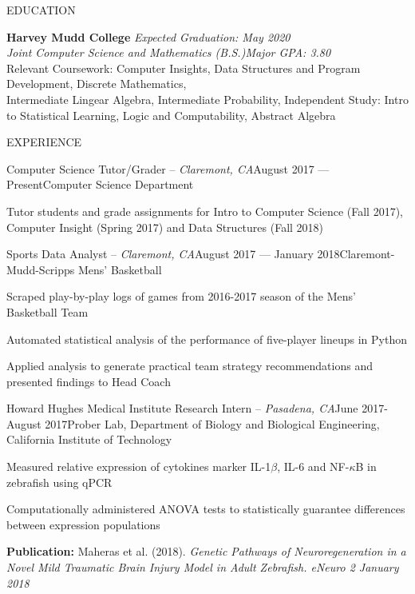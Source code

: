 \documentclass{resume} %
\begin{document}

\begin{rSection}{EDUCATION}

{\bf Harvey Mudd College} \hfill {\em Expected Graduation: May 2020} \\
{\em Joint Computer Science and Mathematics (B.S.)}\hfill {\em Major GPA: 3.80} \\
Relevant Coursework: Computer Insights, Data Structures and Program Development, Discrete Mathematics, \\Intermediate Lingear Algebra, Intermediate Probability, Independent Study: Intro to Statistical Learning, Logic and Computability, Abstract Algebra
\end{rSection}

\begin{rSection}{EXPERIENCE}
\begin{rSubsection}{Computer Science Tutor/Grader -- {\it Claremont, CA}}{August 2017 --- Present}{Computer Science Department}

\item Tutor students and grade assignments for Intro to Computer Science (Fall 2017), Computer Insight (Spring 2017) and Data Structures (Fall 2018)
\end{rSubsection}

\begin{rSubsection}{Sports Data Analyst -- {\it Claremont, CA}}{August 2017 --- January 2018}{Claremont-Mudd-Scripps Mens' Basketball}

\item Scraped play-by-play logs of games from 2016-2017 season of the Mens' Basketball Team
\item Automated statistical analysis of the performance of five-player lineups in Python
\item Applied analysis to generate practical team strategy recommendations and presented findings to Head Coach

\end{rSubsection}


\begin{rSubsection}{Howard Hughes Medical Institute Research Intern -- {\it Pasadena, CA}}{June 2017-August 2017}{Prober Lab, Department of Biology and Biological Engineering, California Institute of Technology}

\item Measured relative expression of cytokines marker IL-1$\beta$, IL-6 and NF-$\kappa$B in zebrafish using qPCR
\item Computationally administered ANOVA tests to statistically guarantee differences between expression populations
\item \textbf{Publication:} Maheras et al. (2018). \textit{Genetic Pathways of Neuroregeneration in a Novel Mild
Traumatic Brain Injury Model in Adult Zebrafish. eNeuro 2 January 2018}
\end{rSubsection}

\end{rSection}
\end{document}
